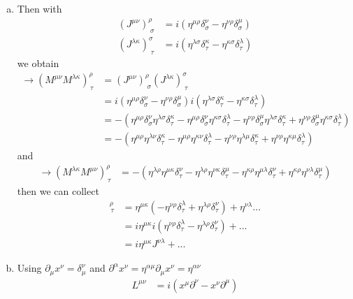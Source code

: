 \documentclass[../main.tex]{subfiles}
\begin{document}
\begin{enumerate}[a)]
\item Then with
\begin{align}
(J^{\mu\nu})^\rho_{\;\sigma}
&=i(\eta^{\mu\rho}\delta^\nu_\sigma-\eta^{\nu\rho}\delta^\mu_\sigma)\\
(J^{\lambda\kappa})^\sigma_{\;\tau}
&=i(\eta^{\lambda\sigma}\delta^\kappa_\tau-\eta^{\kappa\sigma}\delta^\lambda_\tau)
\end{align}
we obtain
\begin{align}
\rightarrow (M^{\mu\nu}M^{\lambda\kappa})^\rho_{\,\tau}
&=(J^{\mu\nu})^\rho_{\;\sigma}(J^{\lambda\kappa})^\sigma_{\;\tau}\\
&=i(\eta^{\mu\rho}\delta^\nu_\sigma-\eta^{\nu\rho}\delta^\mu_\sigma)i(\eta^{\lambda\sigma}\delta^\kappa_\tau-\eta^{\kappa\sigma}\delta^\lambda_\tau)\\
&=-(
\eta^{\mu\rho}\delta^\nu_\sigma \eta^{\lambda\sigma}\delta^\kappa_\tau
-\eta^{\mu\rho}\delta^\nu_\sigma\eta^{\kappa\sigma}\delta^\lambda_\tau
-\eta^{\nu\rho}\delta^\mu_\sigma\eta^{\lambda\sigma}\delta^\kappa_\tau
+\eta^{\nu\rho}\delta^\mu_\sigma\eta^{\kappa\sigma}\delta^\lambda_\tau
)\\
&=-(
\eta^{\mu\rho}\eta^{\lambda\nu}\delta^\kappa_\tau
-\eta^{\mu\rho}\eta^{\kappa\nu}\delta^\lambda_\tau
-\eta^{\nu\rho}\eta^{\lambda\mu}\delta^\kappa_\tau
+\eta^{\nu\rho}\eta^{\kappa\mu}\delta^\lambda_\tau
)
\end{align}
and
\begin{align}
\rightarrow (M^{\lambda\kappa}M^{\mu\nu})^\rho_{\,\tau}
&=-(
\eta^{\lambda\rho}\eta^{\mu\kappa}\delta^\nu_\tau
-\eta^{\lambda\rho}\eta^{\nu\kappa}\delta^\mu_\tau
-\eta^{\kappa\rho}\eta^{\mu\lambda}\delta^\nu_\tau
+\eta^{\kappa\rho}\eta^{\nu\lambda}\delta^\mu_\tau
)
\end{align}
then we can collect
\begin{align}
[M^{\mu\nu},M^{\lambda\kappa}]^\rho_{\,\tau}&=
\eta^{\mu\kappa}(-\eta^{\nu\rho}\delta^\lambda_\tau+\eta^{\lambda\rho}\delta^\nu_\tau)+\eta^{\nu\lambda}...\\
&=i\eta^{\mu\kappa}i(\eta^{\nu\rho}\delta^\lambda_\tau-\eta^{\lambda\rho}\delta^\nu_\tau)+...\\
&=i\eta^{\mu\kappa}J^{\nu\lambda}+...
\end{align}
\item Using $\partial_\mu x^\nu=\delta^\nu_\mu$ and $\partial^\alpha x^\nu=\eta^{\alpha\mu}\partial_\mu x^\nu=\eta^{\alpha\nu}$
\begin{align}
L^{\mu\nu}&=i(x^\mu\partial^\nu-x^\nu\partial^\mu)\\

\end{align}
\end{enumerate}
\end{document}
